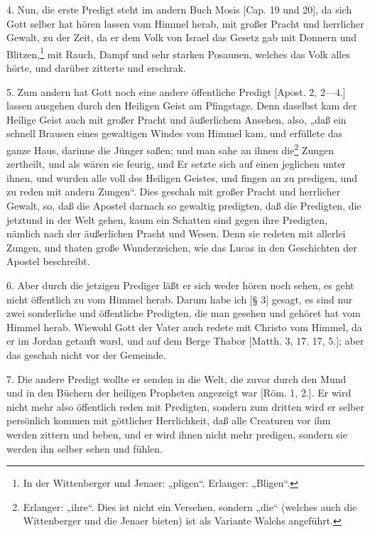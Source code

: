 4. Nun, die erste Predigt steht im andern Buch Mosis [Cap. 19 und 20], da sich Gott selber hat hören lassen vom Himmel herab, mit großer Pracht und herrlicher Gewalt, zu der Zeit, da er dem Volk von Israel das Gesetz gab mit Donnern und Blitzen,\footnote{In der Wittenberger und Jenaer: „pligen“. Erlanger: „Bligen“.} mit Rauch, Dampf und sehr starken Posaunen, welches das Volk alles hörte, und darüber zitterte und erschrak.

5. Zum andern hat Gott noch eine andere öffentliche Predigt [Apost. 2, 2—4.] lassen ausgehen durch den Heiligen Geist am Pfingstage. Denn daselbst kam der Heilige Geist auch mit großer Pracht und äußerlichem Ansehen, also, „daß ein schnell Brausen eines gewaltigen Windes vom Himmel kam, und erfüllete das ganze Haus, darinne die Jünger saßen; und man sahe an ihnen die\footnote{Erlanger: „ihre“. Dies ist nicht ein Versehen, sondern „die“ (welches auch die Wittenberger und die Jenaer bieten) ist als Variante Walchs angeführt.} Zungen zertheilt, und als wären sie feurig, und Er setzte sich auf einen jeglichen unter ihnen, und wurden alle voll des Heiligen Geistes, und fingen an zu predigen, und zu reden mit andern Zungen“. Dies geschah mit großer Pracht und herrlicher Gewalt, so, daß die Apostel darnach so gewaltig predigten, daß die Predigten, die jetztund in der Welt gehen, kaum ein Schatten sind gegen ihre Predigten, nämlich nach der äußerlichen Pracht und Wesen. Denn sie redeten mit allerlei Zungen, und thaten große Wunderzeichen, wie das Lucas in den Geschichten der Apostel beschreibt.

6. Aber durch die jetzigen Prediger läßt er sich weder hören noch sehen, es geht nicht öffentlich zu vom Himmel herab. Darum habe ich [§ 3] gesagt, es sind nur zwei sonderliche und öffentliche Predigten, die man gesehen und gehöret hat vom Himmel herab. Wiewohl Gott der Vater auch redete mit Christo vom Himmel, da er im Jordan getauft ward, und auf dem Berge Thabor [Matth. 3, 17. 17, 5.]; aber das geschah nicht vor der Gemeinde.

7. Die andere Predigt wollte er senden in die Welt, die zuvor durch den Mund und in den Büchern der heiligen Propheten angezeigt war [Röm. 1, 2.]. Er wird nicht mehr also öffentlich reden mit Predigten, sondern zum dritten wird er selber persönlich kommen mit göttlicher Herrlichkeit, daß alle Creaturen vor ihm werden zittern und beben, und er wird ihnen nicht mehr predigen, sondern sie werden ihn selber sehen und fühlen.

